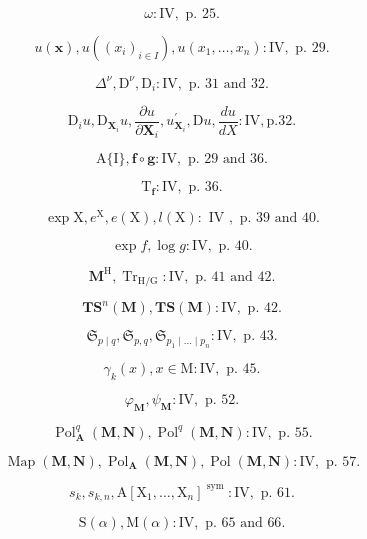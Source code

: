 \[
\omega : \mathrm{IV}, \text { p. } 25.
\]

\[
u (\mathbf {x}), u ((x _ {i}) _ {i \in I}), u (x _ {1}, \dots , x _ {n}): \mathrm{IV}, \text { p. } 29.
\]

\[
\Delta^ {\nu}, \mathrm{D} ^ {\nu}, \mathrm{D} _ {i}: \mathrm{IV}, \text { p. } 31 \text { and } 32.
\]

\[
\mathrm{D} _ {i} u, \mathrm{D} _ {\mathbf {X} _ {i}} u, \frac {\partial u}{\partial \mathbf {X} _ {i}}, u _ {\mathbf {X} _ {i}} ^ {\prime}, \mathrm{D} u, \frac {d u}{d X}: \mathrm{IV}, \mathrm{p.32}.
\]

\[
\mathrm{A} \{\mathrm{I} \}, \mathbf {f} \circ \mathbf {g}: \mathrm{IV}, \text { p. } 29 \text { and } 36.
\]

\[
\mathrm{T} _ {\mathbf {f}}: \mathrm{IV}, \text { p. } 36.
\]

\[
\exp \mathrm{X}, e ^ {\mathrm{X}}, e (\mathrm{X}), l (\mathrm{X}): \text { IV }, \text { p. } 39 \text { and } 40.
\]

\[
\exp f, \log g: \mathrm{IV}, \text { p. } 40.
\]

\[
\mathbf {M} ^ {\mathrm{H}}, \operatorname{Tr} _ {\mathrm{H} / \mathrm{G}}: \mathrm{IV}, \text { p. } 41 \text { and } 42.
\]

\[
\mathbf {T S} ^ {n} (\mathbf {M}), \mathbf {T S} (\mathbf {M}): \mathrm{IV}, \text { p. } 42.
\]

\[
\mathfrak {S} _ {p \mid q}, \mathfrak {S} _ {p, q}, \mathfrak {S} _ {p _ {1} \mid \dots \mid p _ {n}}: \mathrm{IV}, \text {   p.   } 43.
\]

\[
\gamma_ {k} (x), x \in \mathrm{M}: \mathrm{IV}, \text { p. } 45.
\]

\[
\varphi_ {\mathbf {M}}, \psi_ {\mathbf {M}}: \mathrm{IV}, \text { p. } 52.
\]

\[
\operatorname{Pol} _ {\mathbf {A}} ^ {q} (\mathbf {M}, \mathbf {N}), \operatorname{Pol} ^ {q} (\mathbf {M}, \mathbf {N}): \mathrm{IV}, \text { p. } 55.
\]

\[
\operatorname{Map} (\mathbf {M}, \mathbf {N}), \operatorname{Pol} _ {\mathbf {A}} (\mathbf {M}, \mathbf {N}), \operatorname{Pol} (\mathbf {M}, \mathbf {N}): \mathrm{IV}, \text { p. } 57.
\]

\[
s _ {k}, s _ {k, n}, \mathrm{A} [ \mathrm{X} _ {1}, \dots , \mathrm{X} _ {n} ] ^ {\text { sym }}: \mathrm{IV}, \text { p. } 61.
\]

\[
\mathrm{S} (\alpha), \mathrm{M} (\alpha): \mathrm{IV}, \text { p. } 65 \text { and } 66.
\]

